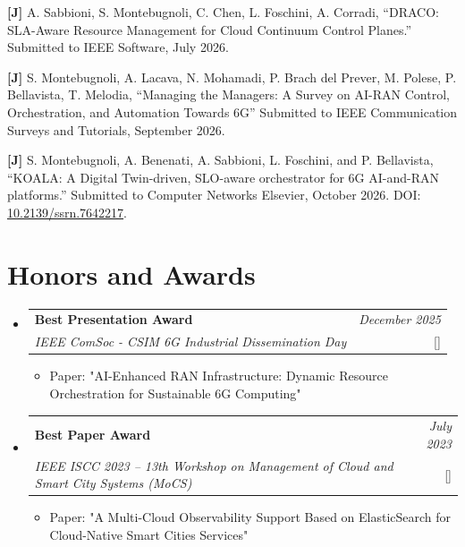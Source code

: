 \documentclass[a4paper,11pt]{article}
\makeatletter
\newcommand{\resumeProject}[4]{
\vspace{0.5mm}\item[]
    \begin{tabular*}{0.98\textwidth}[t]{l@{\extracolsep{\fill}}r}
        \textbf{#1} & \textit{\footnotesize{#3}} \\
        \footnotesize{\textit{#2}} & \footnotesize{#4}
    \end{tabular*}
    \vspace{-2.4mm}
}
\newcommand{\resumeSubHeadingListStart}{\begin{itemize}[leftmargin=*,labelsep=1mm]}
\newcommand{\resumeItemListStart}{\begin{itemize}[leftmargin=*,labelsep=1mm,itemsep=0.5mm]}
\newcommand{\resumeSubHeadingListEnd}{\end{itemize}\vspace{2mm}}
\newcommand{\resumeItemListEnd}{\end{itemize}\vspace{-2mm}}
\makeatother
\begin{document}
{\begin{enumerate}[label={[\arabic*]}, start=17]
    \item \textbf{[J]} A. Sabbioni, S. Montebugnoli, C. Chen, L. Foschini, A. Corradi, ``DRACO: SLA-Aware Resource Management for Cloud Continuum Control Planes.'' Submitted to IEEE Software, July 2026.

    \item \textbf{[J]} S. Montebugnoli, A. Lacava, N. Mohamadi, P. Brach del Prever, M. Polese, P. Bellavista, T. Melodia, ``Managing the Managers: A Survey on AI-RAN Control, Orchestration, and Automation Towards 6G'' Submitted to IEEE Communication Surveys and Tutorials, September 2026.

    \item \textbf{[J]} S. Montebugnoli, A. Benenati, A. Sabbioni, L. Foschini, and P. Bellavista, ``KOALA: A Digital Twin-driven, SLO-aware orchestrator for 6G AI-and-RAN platforms.'' Submitted to Computer Networks Elsevier, October 2026. DOI: \href{https://dx.doi.org/10.2139/ssrn.7642217}{10.2139/ssrn.7642217}.

\end{enumerate}
}

\section{\textbf{Honors and Awards}}
\vspace{-0.4mm}
\resumeSubHeadingListStart

\resumeProject
  {Best Presentation Award}
  {IEEE ComSoc - CSIM 6G Industrial Dissemination Day}
  {December 2025}
  {{}[\href{https://csim.committees.comsoc.org/activities/ieee-csim-idd-event/}{\textcolor{darkblue}{\faIcon{globe}}}]}
\resumeItemListStart
  \item Paper: "AI-Enhanced RAN Infrastructure: Dynamic Resource Orchestration for Sustainable 6G Computing"
\resumeItemListEnd

\resumeProject
  {Best Paper Award}
  {IEEE ISCC 2023 -- 13th Workshop on Management of Cloud and Smart City Systems (MoCS)}
  {July 2023}
  {{}[\href{https://2023.ieee-iscc.org/}{\textcolor{darkblue}{\faIcon{globe}}}]}
\resumeItemListStart
  \item Paper: "A Multi-Cloud Observability Support Based on ElasticSearch for Cloud-Native Smart Cities Services"
\resumeItemListEnd

\resumeSubHeadingListEnd
\vspace{-6mm}

\end{document}
